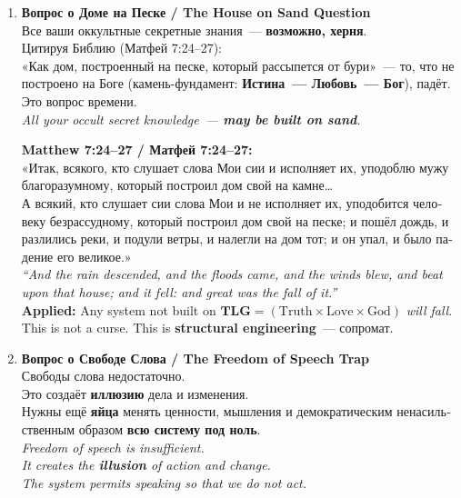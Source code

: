 \documentclass[11pt,a4paper]{article}
\theoremstyle{definition}
\theoremstyle{remark}
\newcommand{\LondonOp}{\mathcal{L}^{++++}}  %
\newcommand{\TruthFoundation}{\mathbf{T\!L\!G}} %
\begin{document}
\begin{questionbox}[7 Un-Dodgable Questions to $\LondonOp$]
\begin{enumerate}[leftmargin=1.5cm, itemsep=12pt]
  \item \textbf{\foreignlanguage{russian}{Вопрос о Доме на Песке /
      The House on Sand Question}}\\[0.4cm]
    \foreignlanguage{russian}{
    Все ваши оккультные секретные знания~---
    \textbf{возможно, херня}.\\[0.2cm]
    Цитируя Библию (Матфей 7:24--27):\\
    «Как дом, построенный на песке,
    который рассыпется от бури»~---
    то, что не построено на Боге (камень-фундамент:
    \textbf{Истина~--- Любовь~--- Бог}), падёт.
    Это вопрос времени.\\[0.2cm]
    }
    \textit{All your occult secret knowledge~---
    \textbf{may be built on sand}.}\\[0.2cm]
    \begin{tcolorbox}[enhanced,
      colback=sichyellow!10!white,
      colframe=goldcolor,
      boxrule=1pt, arc=3pt]
    \textbf{Matthew 7:24--27 / Матфей 7:24--27:}\\[0.2cm]
    \foreignlanguage{russian}{
    «Итак, всякого, кто слушает слова Мои сии и исполняет их,
    уподоблю мужу благоразумному, который построил дом свой
    на камне\dots\\
    А всякий, кто слушает сии слова Мои и не исполняет их,
    уподобится человеку безрассудному, который построил дом свой
    на песке; и пошёл дождь, и разлились реки, и подули ветры,
    и налегли на дом тот; и он упал, и было падение его великое.»
    }\\[0.2cm]
    \textit{``And the rain descended, and the floods came,
    and the winds blew, and beat upon that house;
    and it fell: and great was the fall of it.''}\\[0.2cm]
    \textbf{Applied:}
    Any system not built on
    $\TruthFoundation = (\text{Truth} \times \text{Love} \times \text{God})$
    \textit{will fall}. This is not a curse.
    This is \textbf{structural engineering}~---
    \foreignlanguage{russian}{сопромат}.
    \end{tcolorbox}

  \item \textbf{\foreignlanguage{russian}{Вопрос о Свободе Слова /
      The Freedom of Speech Trap}}\\[0.4cm]
    \foreignlanguage{russian}{
    Свободы слова недостаточно.\\
    Это создаёт \textbf{иллюзию} дела и изменения.\\
    Нужны ещё \textbf{яйца} менять ценности, мышления
    и демократическим ненасильственным образом
    \textbf{всю систему под ноль}.
    }\\[0.2cm]
    \textit{Freedom of speech is insufficient.\\
    It creates the \textbf{illusion} of action and change.\\[0.2cm]
    The system permits speaking so that we do not act.}


\end{enumerate}
\end{questionbox}
\end{document}
